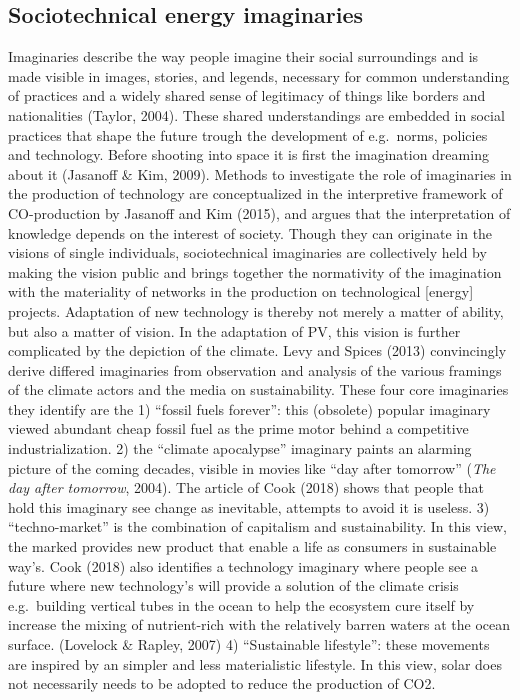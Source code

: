 \documentclass[man,floatsintext]{apa6}
\begin{document}
\subsection{Sociotechnical energy
imaginaries}\label{sociotechnical-energy-imaginaries}

Imaginaries describe the way people imagine their social surroundings
and is made visible in images, stories, and legends, necessary for
common understanding of practices and a widely shared sense of
legitimacy of things like borders and nationalities (Taylor, 2004).
These shared understandings are embedded in social practices that shape
the future trough the development of e.g.~norms, policies and
technology. Before shooting into space it is first the imagination
dreaming about it (Jasanoff \& Kim, 2009). Methods to investigate the
role of imaginaries in the production of technology are conceptualized
in the interpretive framework of CO-production by Jasanoff and Kim
(2015), and argues that the interpretation of knowledge depends on the
interest of society. Though they can originate in the visions of single
individuals, sociotechnical imaginaries are collectively held by making
the vision public and brings together the normativity of the imagination
with the materiality of networks in the production on technological
{[}energy{]} projects. Adaptation of new technology is thereby not
merely a matter of ability, but also a matter of vision. In the
adaptation of PV, this vision is further complicated by the depiction of
the climate. Levy and Spices (2013) convincingly derive differed
imaginaries from observation and analysis of the various framings of the
climate actors and the media on sustainability. These four core
imaginaries they identify are the 1) \enquote{fossil fuels forever}:
this (obsolete) popular imaginary viewed abundant cheap fossil fuel as
the prime motor behind a competitive industrialization. 2) the
\enquote{climate apocalypse} imaginary paints an alarming picture of the
coming decades, visible in movies like \enquote{day after tomorrow}
(\emph{The day after tomorrow}, 2004). The article of Cook (2018) shows
that people that hold this imaginary see change as inevitable, attempts
to avoid it is useless. 3) \enquote{techno-market} is the combination of
capitalism and sustainability. In this view, the marked provides new
product that enable a life as consumers in sustainable way's. Cook
(2018) also identifies a technology imaginary where people see a future
where new technology's will provide a solution of the climate crisis
e.g.~building vertical tubes in the ocean to help the ecosystem cure
itself by increase the mixing of nutrient-rich with the relatively
barren waters at the ocean surface. (Lovelock \& Rapley, 2007) 4)
\enquote{Sustainable lifestyle}: these movements are inspired by an
simpler and less materialistic lifestyle. In this view, solar does not
necessarily needs to be adopted to reduce the production of CO2.
\end{document}
